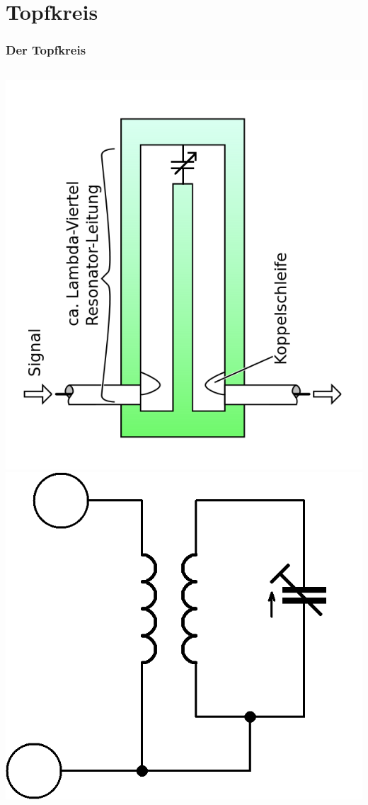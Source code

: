 \section*{Topfkreis}
\begin{frame}
  \frametitle{Der Topfkreis}
  \begin{columns}
    \includegraphics[width=\textwidth,height=.4\textheight,keepaspectratio]{a10/Topfkreis.png}\\
    \includegraphics[width=\textwidth,height=.4\textheight,keepaspectratio]{a10/Topfkreis-ESB.png}\\

\end{columns}
\end{frame}
